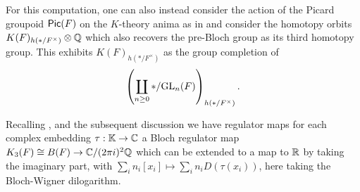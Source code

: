 \begin{remark}
    For this computation, one can also instead consider the action of the Picard groupoid $\mathsf{Pic}(F)$ on the $K$-theory anima as in  and consider the homotopy orbits $K(F)_{h(*/F^{\times})}\otimes\mathbb{Q}$ which also recovers the pre-Bloch group as its third homotopy group. This exhibits $K(F)_{h(*/F^{\times})}$ as the group completion of $$\left(\coprod_{n\geq0}*/\mathrm{GL}_{n}(F)\right)_{h(*/F^{\times})}.$$
\end{remark}
Recalling , and the subsequent discussion we have regulator maps for each complex embedding $\tau:\mathbb{K}\to\mathbb{C}$ a Bloch regulator map $K_{3}(F)\cong B(F)\to\mathbb{C}/(2\pi i)^{2}\mathbb{Q}$ which can be extended to a map to $\mathbb{R}$ by taking the imaginary part, with $\sum_{i}n_{i}[x_{i}]\mapsto\sum_{i}n_{i}D(\tau(x_{i}))$, here taking the Bloch-Wigner dilogarithm. 